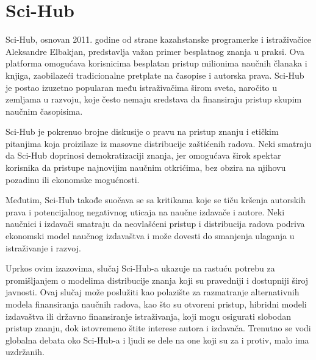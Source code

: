 \documentclass[a4paper]{article}
\begin{document}
{\setlength{\parskip}{1em}


\section{Sci-Hub}	
\label{sec:sci-hub}

Sci-Hub, osnovan 2011. godine od strane kazahstanske programerke i istraživačice Aleksandre Elbakjan, predstavlja važan primer besplatnog znanja u praksi. Ova platforma omogućava korisnicima besplatan pristup milionima naučnih članaka i knjiga, zaobilazeći tradicionalne pretplate na časopise i autorska prava. Sci-Hub je postao izuzetno popularan među istraživačima širom sveta, naročito u zemljama u razvoju, koje često nemaju sredstava da finansiraju pristup skupim naučnim časopisima.

Sci-Hub je pokrenuo brojne diskusije o pravu na pristup znanju i etičkim pitanjima koja proizilaze iz masovne distribucije zaštićenih radova. Neki smatraju da Sci-Hub doprinosi demokratizaciji znanja, jer omogućava širok spektar korisnika da pristupe najnovijim naučnim otkrićima, bez obzira na njihovu pozadinu ili ekonomske mogućnosti.

Međutim, Sci-Hub takođe suočava se sa kritikama koje se tiču kršenja autorskih prava i potencijalnog negativnog uticaja na naučne izdavače i autore. Neki naučnici i izdavači smatraju da neovlašćeni pristup i distribucija radova podriva ekonomski model naučnog izdavaštva i može dovesti do smanjenja ulaganja u istraživanje i razvoj.

Uprkos ovim izazovima, slučaj Sci-Hub-a ukazuje na rastuću potrebu za promišljanjem o modelima distribucije znanja koji su pravedniji i dostupniji široj javnosti. Ovaj slučaj može poslužiti kao polazište za razmatranje alternativnih modela finansiranja naučnih radova, kao što su otvoreni pristup, hibridni modeli izdavaštva ili državno finansiranje istraživanja, koji mogu osigurati slobodan pristup znanju, dok istovremeno štite interese autora i izdavača. Trenutno se vodi globalna debata oko Sci-Hub-a i ljudi se dele na one koji su za i protiv, malo ima uzdržanih.

\setlength{\parskip}{2em}


\begin{verbatim}

\end{verbatim}

}
\end{document}
